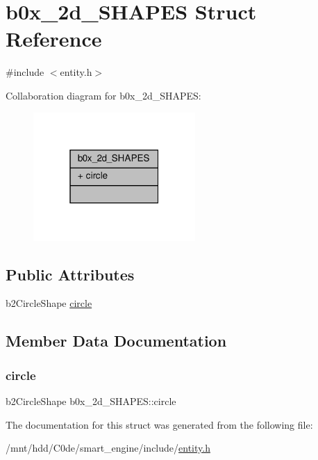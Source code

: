 \hypertarget{structb0x__2d__SHAPES}{}\section{b0x\+\_\+2d\+\_\+\+S\+H\+A\+P\+ES Struct Reference}
\label{structb0x__2d__SHAPES}


{\ttfamily \#include $<$entity.\+h$>$}



Collaboration diagram for b0x\+\_\+2d\+\_\+\+S\+H\+A\+P\+ES\+:
\nopagebreak
\begin{figure}[H]
\begin{center}
\leavevmode
\includegraphics[width=175pt]{structb0x__2d__SHAPES__coll__graph}
\end{center}
\end{figure}
\subsection*{Public Attributes}
\begin{DoxyCompactItemize}
\item 
b2\+Circle\+Shape \hyperlink{structb0x__2d__SHAPES_ac328aa711add03e4823470a27d286122}{circle}
\end{DoxyCompactItemize}


\subsection{Member Data Documentation}
\mbox{\label{structb0x__2d__SHAPES_ac328aa711add03e4823470a27d286122}} 
\subsubsection{\texorpdfstring{circle}{circle}}
{\footnotesize\ttfamily b2\+Circle\+Shape b0x\+\_\+2d\+\_\+\+S\+H\+A\+P\+E\+S\+::circle}



The documentation for this struct was generated from the following file\+:\begin{DoxyCompactItemize}
\item 
/mnt/hdd/\+C0de/smart\+\_\+engine/include/\hyperlink{entity_8h}{entity.\+h}\end{DoxyCompactItemize}
